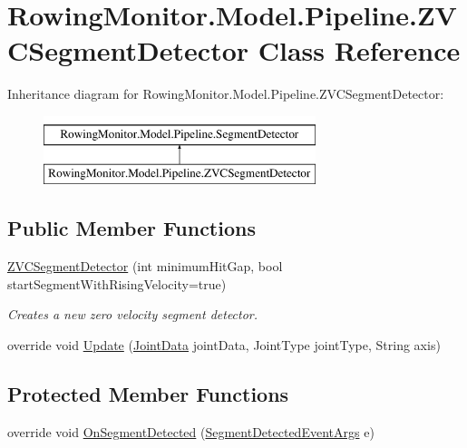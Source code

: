\hypertarget{class_rowing_monitor_1_1_model_1_1_pipeline_1_1_z_v_c_segment_detector}{}\section{Rowing\+Monitor.\+Model.\+Pipeline.\+Z\+V\+C\+Segment\+Detector Class Reference}
\label{class_rowing_monitor_1_1_model_1_1_pipeline_1_1_z_v_c_segment_detector}
Inheritance diagram for Rowing\+Monitor.\+Model.\+Pipeline.\+Z\+V\+C\+Segment\+Detector\+:\begin{figure}[H]
\begin{center}
\leavevmode
\includegraphics[height=2.000000cm]{class_rowing_monitor_1_1_model_1_1_pipeline_1_1_z_v_c_segment_detector}
\end{center}
\end{figure}
\subsection*{Public Member Functions}
\begin{DoxyCompactItemize}
\item 
\hyperlink{class_rowing_monitor_1_1_model_1_1_pipeline_1_1_z_v_c_segment_detector_ae8612877f3f7310db743529f61547616}{Z\+V\+C\+Segment\+Detector} (int minimum\+Hit\+Gap, bool start\+Segment\+With\+Rising\+Velocity=true)
\begin{DoxyCompactList}\small\item\em Creates a new zero velocity segment detector. \end{DoxyCompactList}\item 
override void \hyperlink{class_rowing_monitor_1_1_model_1_1_pipeline_1_1_z_v_c_segment_detector_a81c28e4ede1561c2fe1eca29f63f0767}{Update} (\hyperlink{struct_rowing_monitor_1_1_model_1_1_util_1_1_joint_data}{Joint\+Data} joint\+Data, Joint\+Type joint\+Type, String axis)
\end{DoxyCompactItemize}
\subsection*{Protected Member Functions}
\begin{DoxyCompactItemize}
\item 
override void \hyperlink{class_rowing_monitor_1_1_model_1_1_pipeline_1_1_z_v_c_segment_detector_a5eab838eda9f217722dfa05bc9d5095b}{On\+Segment\+Detected} (\hyperlink{class_rowing_monitor_1_1_model_1_1_segment_detected_event_args}{Segment\+Detected\+Event\+Args} e)
\end{DoxyCompactItemize}
